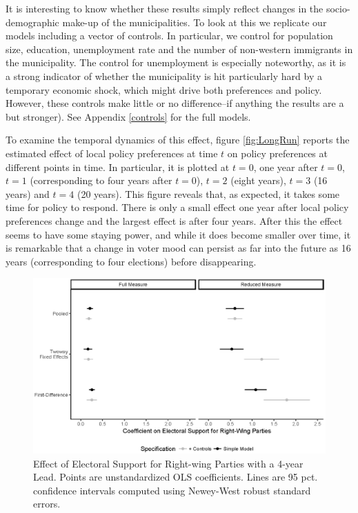 \documentclass[a4paper,12pt]{article}
\begin{document}
It is interesting to know whether these results simply reflect changes in the socio-demographic make-up of the municipalities. To look at this we replicate our models including a vector of controls. In particular, we control for population size, education, unemployment rate and the number of non-western immigrants in the municipality. The control for unemployment is especially noteworthy, as it is a strong indicator of whether the municipality is hit particularly hard by a temporary economic shock, which might drive both preferences and policy. However, these controls make little or no difference--if anything the results are a but stronger). See Appendix \ref{controls} for the full models. 

To examine the temporal dynamics of this effect, figure \ref{fig:LongRun} reports the estimated effect of local policy preferences at time $t$ on policy preferences at different points in time. In particular, it is plotted at $t=0$, one year after $t=0$, $t=1$ (corresponding to four years after $t=0$), $t=2$ (eight years), $t=3$ (16 years) and $t=4$ (20 years). This figure reveals that, as expected, it takes some time for policy to respond. There is only a small effect one year after local policy preferences change and the largest effect is  after four years. After this the effect seems to have some staying power, and while it does become smaller over time, it is remarkable that a change in voter mood can persist as far into the future as 16 years (corresponding to four elections) before disappearing.

\begin{figure}[h]
	\centering
	\includegraphics[scale = 0.8]{coef_11092018.eps}
	\caption{Effect of Electoral Support for Right-wing Parties with a 4-year Lead. Points are unstandardized OLS coefficients. Lines are 95 pct. confidence intervals computed using Newey-West robust standard errors.}
	\label{fig:FourYearLead}
\end{figure}
\end{document}
